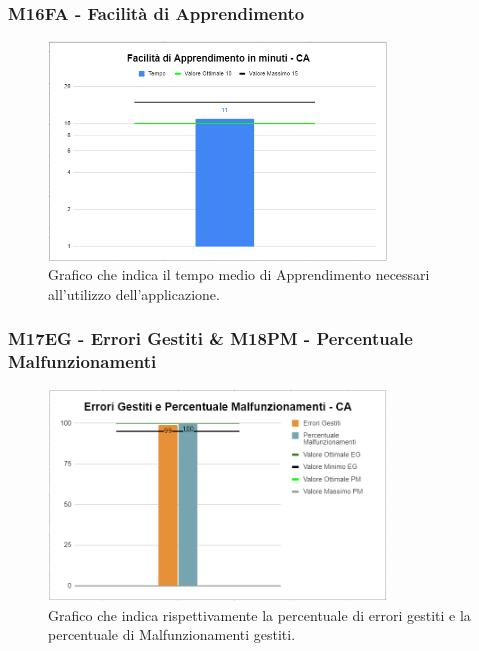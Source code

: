 \subsubsection{M16FA - Facilità di Apprendimento}
 \begin{figure}[H]
  \centering\includegraphics[width=0.8\textwidth, height=0.8\textheight,keepaspectratio]{images/CA-Apprendimento.png}
   \caption{Grafico che indica il tempo medio di Apprendimento necessari all'utilizzo dell'applicazione.}
 \end{figure} 

\subsubsection{M17EG - Errori Gestiti \& M18PM - Percentuale Malfunzionamenti}
\begin{figure}[H]
 \centering\includegraphics[width=0.8\textwidth, height=0.8\textheight,keepaspectratio]{images/CA-Errori.png}
  \caption{Grafico che indica rispettivamente la percentuale di errori gestiti e la percentuale di Malfunzionamenti gestiti.}
\end{figure}  


